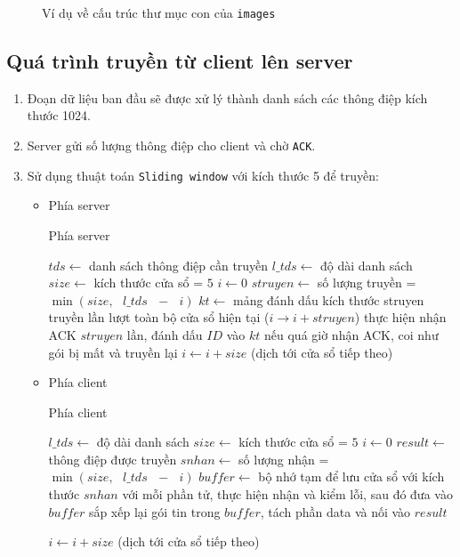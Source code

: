 \begin{figure}[H]
\caption{Ví dụ về cấu trúc thư mục con của \texttt{images}}
\end{figure}

\subsection{Quá trình truyền từ client lên server}
\begin{enumerate}
\item Đoạn dữ liệu ban đầu sẽ được xử lý thành danh sách các thông điệp kích thước 1024.
\item Server gửi số lượng thông điệp cho client và chờ \texttt{ACK}.
\item Sử dụng thuật toán \texttt{Sliding window} với kích thước 5 để truyền:
\begin{itemize}
\item Phía server
\begin{breakablealgorithm}
  \caption{Phía server}
  \begin{algorithmic}[1]
	\State $tds \gets $ danh sách thông điệp cần truyền
	\State $l\_tds \gets $ độ dài danh sách
    \State $size \gets $ kích thước cửa sổ = $5$
    \State $i \gets 0 $
    	\State $struyen \gets $ số lượng truyền = $\min\left( {size,{\text{ }}l\_tds{\text{ }} - {\text{ }}i} \right)$
    	\State $kt \gets$ mảng đánh dấu kích thước struyen
    		\State truyền lần lượt toàn bộ cửa sổ hiện tại ($i \to i + struyen$)
    		\State thực hiện nhận ACK $struyen$ lần, đánh dấu $ID$ vào $kt$
    		\State nếu quá giờ nhận ACK, coi như gói bị mất và truyền lại
    	\EndWhile
    	\State $i \gets i + size$ (dịch tới cửa sổ tiếp theo)
    \EndWhile
    \EndFunction
  \end{algorithmic}
\end{breakablealgorithm}
\item Phía client
\begin{breakablealgorithm}
  \caption{Phía client}
  \begin{algorithmic}[1]

	\State $l\_tds \gets $ độ dài danh sách
    \State $size \gets $ kích thước cửa sổ = $5$
    \State $i \gets 0 $
    \State $result \gets $ thông điệp được truyền
    	\State $snhan \gets $ số lượng nhận = $\min\left( {size,{\text{ }}l\_tds{\text{ }} - {\text{ }}i} \right)$
    	\State $buffer \gets$ bộ nhớ tạm để lưu cửa sổ với kích thước $snhan$
    		\State với mỗi phần tử, thực hiện nhận và kiểm lỗi, sau đó đưa vào $buffer$
    	\EndWhile
    	\State sắp xếp lại gói tin trong $buffer$, tách phần data và nối vào $result$

    	\State $i \gets i + size$ (dịch tới cửa sổ tiếp theo)
    \EndWhile
    \EndFunction
  \end{algorithmic}
\end{breakablealgorithm}
\end{itemize}
\end{enumerate}